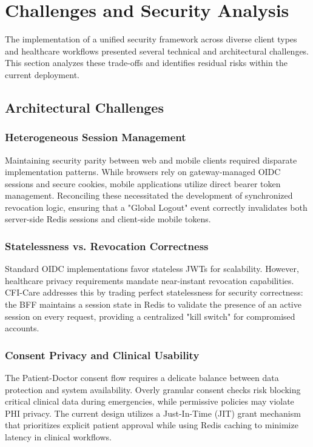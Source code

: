 \section{Challenges and Security Analysis}\label{sec:security-challenges}

The implementation of a unified security framework across diverse client types and healthcare workflows presented several technical and architectural challenges. This section analyzes these trade-offs and identifies residual risks within the current deployment.

\subsection{Architectural Challenges}

\subsubsection{Heterogeneous Session Management}
Maintaining security parity between web and mobile clients required disparate implementation patterns. While browsers rely on gateway-managed OIDC sessions and secure cookies, mobile applications utilize direct bearer token management. Reconciling these necessitated the development of synchronized revocation logic, ensuring that a "Global Logout" event correctly invalidates both server-side Redis sessions and client-side mobile tokens.

\subsubsection{Statelessness vs. Revocation Correctness}
Standard \ac{OIDC} implementations favor stateless \acp{JWT} for scalability. However, healthcare privacy requirements mandate near-instant revocation capabilities. CFI-Care addresses this by trading perfect statelessness for security correctness: the BFF maintains a session state in Redis to validate the presence of an active session on every request, providing a centralized "kill switch" for compromised accounts.

\subsubsection{Consent Privacy and Clinical Usability}
The Patient-Doctor consent flow requires a delicate balance between data protection and system availability. Overly granular consent checks risk blocking critical clinical data during emergencies, while permissive policies may violate \ac{PHI} privacy. The current design utilizes a Just-In-Time (JIT) grant mechanism that prioritizes explicit patient approval while using Redis caching to minimize latency in clinical workflows.

